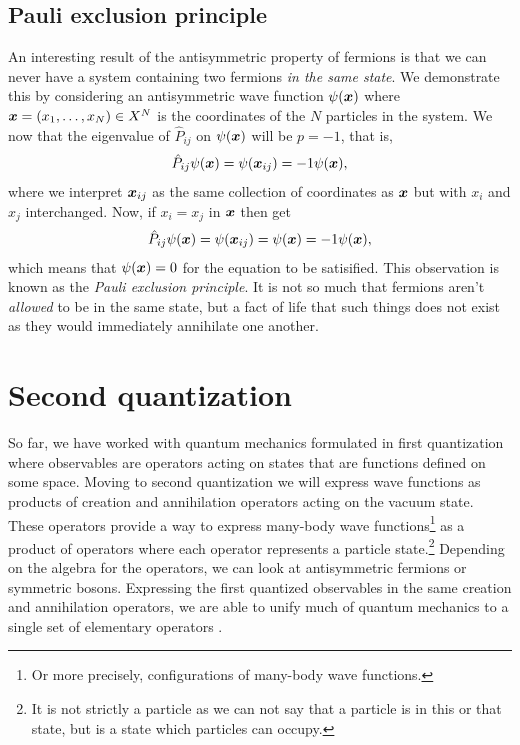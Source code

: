         \subsection{Pauli exclusion principle}
            An interesting result of the antisymmetric property of fermions is
            that we can never have a system containing two fermions \emph{in the
            same state}.
            We demonstrate this by considering an antisymmetric wave function
            $\psi(\boldsymbol{x})$ where $\boldsymbol{x} = (x_1, \dots, x_N) \in X^{N}$ is the
            coordinates of the $N$ particles in the system.
            We now that the eigenvalue of $\hat{P}_{ij}$ on $\psi(\boldsymbol{x})$ will
            be $p = -1$, that is,
            \begin{align}
                \hat{P}_{ij}\psi(\boldsymbol{x})
                = \psi(\boldsymbol{x}_{ij})
                = -1\psi(\boldsymbol{x}),
            \end{align}
            where we interpret $\boldsymbol{x}_{ij}$ as the same collection of
            coordinates as $\boldsymbol{x}$ but with $x_i$ and $x_j$ interchanged.
            Now, if $x_i = x_j$ in $\boldsymbol{x}$ then get
            \begin{gather}
                \hat{P}_{ij}\psi(\boldsymbol{x})
                = \psi(\boldsymbol{x}_{ij})
                = \psi(\boldsymbol{x})
                = -1\psi(\boldsymbol{x}),
            \end{gather}
            which means that $\psi(\boldsymbol{x}) = 0$ for the equation to be
            satisified.
            This observation is known as the \emph{Pauli exclusion
            principle}.
            It is not so much that fermions aren't \emph{allowed} to be in the
            same state, but a fact of life that such things does not exist as
            they would immediately annihilate one another.


    \section{Second quantization}
        So far, we have worked with quantum mechanics formulated in first
        quantization where observables are operators acting on states that are
        functions defined on some space.
        Moving to second quantization we will express wave functions as products
        of creation and annihilation operators acting on the vacuum state.
        These operators provide a way to express many-body wave
        functions\footnote{%
            Or more precisely, configurations of many-body wave functions.%
        } as a product of operators where each operator represents a particle
        state.\footnote{%
            It is not strictly a particle as we can not say that a particle is
            in this or that state, but is a state which particles can occupy.
        }
        Depending on the algebra for the operators, we can look at antisymmetric
        fermions or symmetric bosons.
        Expressing the first quantized observables in the same creation and
        annihilation operators, we are able to unify much of quantum mechanics
        to a single set of elementary operators \cite{helgaker-molecular}.

